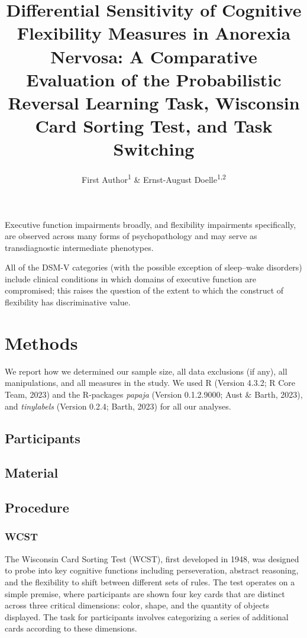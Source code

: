 \documentclass[
  man]{apa6}
\title{Differential Sensitivity of Cognitive Flexibility Measures in Anorexia Nervosa: A Comparative Evaluation of the Probabilistic Reversal Learning Task, Wisconsin Card Sorting Test, and Task Switching}
\author{First Author\textsuperscript{1} \& Ernst-August Doelle\textsuperscript{1,2}}
\date{}
\affiliation{\vspace{0.5cm}\textsuperscript{1} Wilhelm-Wundt-University\\\textsuperscript{2} Konstanz Business School}
\begin{document}
\maketitle

Executive function impairments broadly, and flexibility impairments specifically, are observed across many forms of psychopathology and may serve as transdiagnostic intermediate phenotypes.

All of the DSM-V categories (with the possible exception of sleep--wake disorders) include clinical conditions in which domains of executive function are compromised; this raises the question of the extent to which the construct of flexibility has discriminative value.

\section{Methods}\label{methods}

We report how we determined our sample size, all data exclusions (if any), all manipulations, and all measures in the study.
We used R (Version 4.3.2; R Core Team, 2023) and the R-packages \emph{papaja} (Version 0.1.2.9000; Aust \& Barth, 2023), and \emph{tinylabels} (Version 0.2.4; Barth, 2023) for all our analyses.

\subsection{Participants}\label{participants}

\subsection{Material}\label{material}

\subsection{Procedure}\label{procedure}

\subsubsection{WCST}\label{wcst}

The Wisconsin Card Sorting Test (WCST), first developed in 1948, was designed to probe into key cognitive functions including perseveration, abstract reasoning, and the flexibility to shift between different sets of rules. The test operates on a simple premise, where participants are shown four key cards that are distinct across three critical dimensions: color, shape, and the quantity of objects displayed. The task for participants involves categorizing a series of additional cards according to these dimensions.
\end{document}
